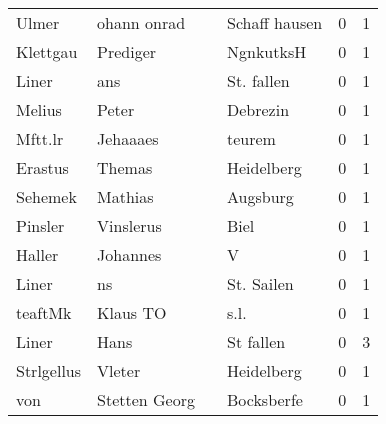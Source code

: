 \begin{tabular}{llllrr}
                    Ulmer &                        ohann onrad &             &                               Schaff hausen &          0 &         1 \\
                 Klettgau &                           Prediger &             &                                   NgnkutksH &          0 &         1 \\
                    Liner &                                ans &             &                                  St. fallen &          0 &         1 \\
                   Melius &                              Peter &             &                                    Debrezin &          0 &         1 \\
                  Mftt.lr &                           Jehaaaes &             &                                      teurem &          0 &         1 \\
                  Erastus &                             Themas &             &                                  Heidelberg &          0 &         1 \\
                  Sehemek &                            Mathias &             &                                    Augsburg &          0 &         1 \\
                  Pinsler &                          Vinslerus &             &                                        Biel &          0 &         1 \\
                   Haller &                           Johannes &             &                                           V &          0 &         1 \\
                    Liner &                                 ns &             &                                  St. Sailen &          0 &         1 \\
                  teaftMk &                           Klaus TO &             &                                        s.l. &          0 &         1 \\
                    Liner &                               Hans &             &                                   St fallen &          0 &         3 \\
               Strlgellus &                             Vleter &             &                                  Heidelberg &          0 &         1 \\
                      von &                      Stetten Georg &             &                                  Bocksberfe &          0 &         1 \\

\end{tabular}
